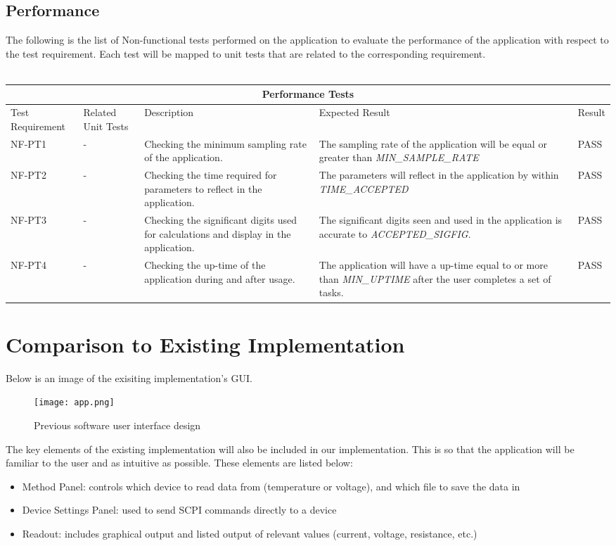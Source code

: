 \documentclass[12pt, titlepage]{article}
\begin{document}
\subsection{Performance}
The following is the list of Non-functional tests performed on the application to evaluate the performance of the application with respect to the test requirement. Each test will be mapped to unit tests that are related to the corresponding requirement.\\
\\
\begin{tabular}{ |p{2.3cm}||p{2cm}|p{3cm}|p{4cm}|p{2cm}| }
  \hline
  \multicolumn{5}{|c|}{Performance Tests} \\
  \hline
  Test Requirement & Related Unit Tests & Description & Expected Result & Result\\
  \hline
  NF-PT1   & - & Checking the minimum sampling rate of the application.  & The sampling rate of the application will be equal or greater than \textsl{MIN\_SAMPLE\_RATE} & PASS\\
  \hline
  NF-PT2   & - & Checking the time required for parameters to reflect in the application.  & The parameters will reflect in the application by within \textsl{TIME\_ACCEPTED} & PASS\\
  \hline
  NF-PT3   & - & Checking the significant digits used for calculations and display in the application.  &  The significant digits seen and used in the application is accurate to \textsl{ACCEPTED\_SIGFIG}. & PASS\\
  \hline
  NF-PT4   & - & Checking the up-time of the application during and after usage.  &  The application will have a up-time equal to or more than \textsl{MIN\_UPTIME} after the user completes a set of tasks. & PASS\\
  \hline
 \end{tabular}

	
 \pagebreak
\section{Comparison to Existing Implementation}	

\noindent Below is an image of the exisiting implementation's GUI.

\begin{figure}[H]
\centerline{\texttt{[image: app.png]}}
\caption{Previous software user interface design}
\label{fig}
\end{figure}

\noindent The key elements of the existing implementation will also be included in our implementation. This is so that the application will be familiar to the user and as intuitive as possible. These elements are listed below:
\begin{itemize}
  \item Method Panel: controls which device to read data from (temperature or voltage), and which file to save the data in
  \item Device Settings Panel: used to send SCPI commands directly to a device
  \item Readout: includes graphical output and listed output of relevant values (current, voltage, resistance, etc.)
\end{itemize}
\end{document}
